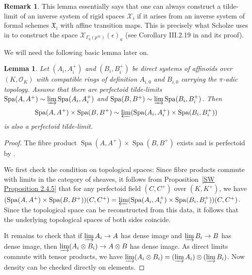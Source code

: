 \documentclass[10pt,oneside]{amsart}
\newtheorem{lemma}[theorem]{Lemma}
\theoremstyle{definition}
\newtheorem{remark}[theorem]{Remark}
\begin{document}
	\begin{remark}
	This lemma essentially says that one can always construct a tilde-limit of an inverse system of rigid spaces $\mathcal X_i$ if it arises from an inverse system of formal schemes $\mathfrak X_i$ with affine transition maps. This is precisely what Scholze uses in \cite{torsion} to construct the space $\mathcal X_{\Gamma_0(p^\infty)}(\epsilon)_a$ (see Corollary III.2.19 in \cite{torsion} and its proof).
	\end{remark}
	
		
We will need the following basic lemma later on.

	\begin{lemma}\label{affinoid tilde-limits commute with fibre products}
		Let $(A_i, A_i^+)$ and $(B_i, B_i^+)$ be direct systems of affinoids over $(K, \mathcal O_K)$ with compatible rings of definition $A_{i,0}$ and $B_{i,0}$ carrying the $\pi$-adic topology. Assume that there are perfectoid tilde-limits $\operatorname{Spa}(A, A^+)\sim \varinjlim \operatorname{Spa}(A_i, A_i^+)$ and $\operatorname{Spa}(B, B^+)\sim \varinjlim \operatorname{Spa}(B_i, B_i^+)$. Then \[\operatorname{Spa}(A, A^+)\times\operatorname{Spa}(B, B^+)\sim\varprojlim (\operatorname{Spa}(A_i, A_i^+)\times \operatorname{Spa}(B_i, B_i^+))\]
		is also a perfectoid tilde-limit.
	\end{lemma}
	\begin{proof}
		The fibre product $\operatorname{Spa}(A, A^+)\times\operatorname{Spa}(B, B^+)$ exists and is perfectoid by \cite[Prop 6.18]{perfectoid}.
		
		We first check the condition on topological spaces:
		 Since fibre products commute with limits in the category of sheaves, it follows from Proposition~\ref{SW Proposition 2.4.5} that for any perfectoid field $(C,C^+)$ over $(K,K^+)$, we have $(\operatorname{Spa}(A, A^+)\times\operatorname{Spa}(B, B^+))(C,C^+)=\varprojlim (\operatorname{Spa}(A_i, A_i^+)\times \operatorname{Spa}(B_i, B_i^+))(C,C^+)$. Since the topological space can be reconstructed from this data, it follows that the underlying topological spaces of both sides coincide.
		
		It remains to check that if $\varinjlim A_i \rightarrow A$ has dense image and $\varinjlim B_i \rightarrow B$ has dense image, then $\varinjlim (A_i\otimes B_i) \rightarrow A\otimes B$ has dense image. As direct limits commute with tensor products, we have $\varinjlim (A_i\otimes B_i) = (\varinjlim A_i)\otimes (\varinjlim B_i)$. Now density can be checked directly on elements. 
	\end{proof}
\end{document}

